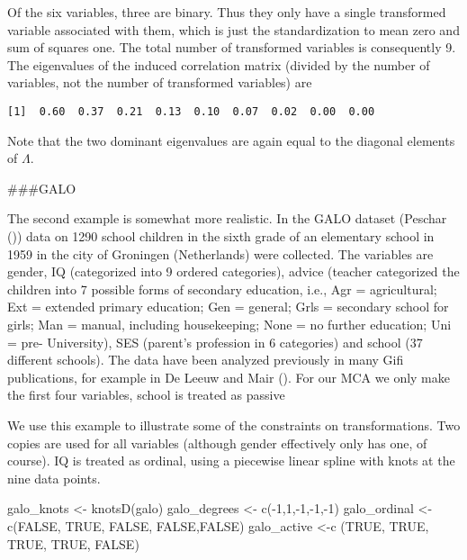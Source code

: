 \documentclass[
  12pt,
  letterpaper,
]{scrbook}
\newenvironment{Shaded}{\begin{snugshade}}{\end{snugshade}}
\newcommand{\ConstantTok}[1]{\textcolor[rgb]{0.56,0.35,0.01}{#1}}
\newcommand{\DecValTok}[1]{\textcolor[rgb]{0.68,0.00,0.00}{#1}}
\newcommand{\FunctionTok}[1]{\textcolor[rgb]{0.28,0.35,0.67}{#1}}
\newcommand{\NormalTok}[1]{\textcolor[rgb]{0.00,0.23,0.31}{#1}}
\newcommand{\OtherTok}[1]{\textcolor[rgb]{0.00,0.23,0.31}{#1}}
\newcommand{\SpecialCharTok}[1]{\textcolor[rgb]{0.37,0.37,0.37}{#1}}
\begin{document}
Of the six variables, three are binary. Thus they only have a single
transformed variable associated with them, which is just the
standardization to mean zero and sum of squares one. The total number of
transformed variables is consequently 9. The eigenvalues of the induced
correlation matrix (divided by the number of variables, not the number
of transformed variables) are

\begin{verbatim}
[1]  0.60  0.37  0.21  0.13  0.10  0.07  0.02  0.00  0.00
\end{verbatim}

Note that the two dominant eigenvalues are again equal to the diagonal
elements of \(\Lambda\).

\#\#\#GALO

The second example is somewhat more realistic. In the GALO dataset
(Peschar ()) data on 1290 school children
in the sixth grade of an elementary school in 1959 in the city of
Groningen (Netherlands) were collected. The variables are gender, IQ
(categorized into 9 ordered categories), advice (teacher categorized the
children into 7 possible forms of secondary education, i.e., Agr =
agricultural; Ext = extended primary education; Gen = general; Grls =
secondary school for girls; Man = manual, including housekeeping; None =
no further education; Uni = pre- University), SES (parent's profession
in 6 categories) and school (37 different schools). The data have been
analyzed previously in many Gifi publications, for example in De Leeuw
and Mair (). For our MCA we only
make the first four variables, school is treated as passive

We use this example to illustrate some of the constraints on
transformations. Two copies are used for all variables (although gender
effectively only has one, of course). IQ is treated as ordinal, using a
piecewise linear spline with knots at the nine data points.

\begin{Shaded}
\begin{Highlighting}[]
\NormalTok{galo\_knots }\OtherTok{\textless{}{-}} \FunctionTok{knotsD}\NormalTok{(galo)}
\NormalTok{galo\_degrees }\OtherTok{\textless{}{-}} \FunctionTok{c}\NormalTok{(}\SpecialCharTok{{-}}\DecValTok{1}\NormalTok{,}\DecValTok{1}\NormalTok{,}\SpecialCharTok{{-}}\DecValTok{1}\NormalTok{,}\SpecialCharTok{{-}}\DecValTok{1}\NormalTok{,}\SpecialCharTok{{-}}\DecValTok{1}\NormalTok{)}
\NormalTok{galo\_ordinal }\OtherTok{\textless{}{-}} \FunctionTok{c}\NormalTok{(}\ConstantTok{FALSE}\NormalTok{, }\ConstantTok{TRUE}\NormalTok{, }\ConstantTok{FALSE}\NormalTok{, }\ConstantTok{FALSE}\NormalTok{,}\ConstantTok{FALSE}\NormalTok{)}
\NormalTok{galo\_active }\OtherTok{\textless{}{-}}\FunctionTok{c}\NormalTok{ (}\ConstantTok{TRUE}\NormalTok{, }\ConstantTok{TRUE}\NormalTok{, }\ConstantTok{TRUE}\NormalTok{, }\ConstantTok{TRUE}\NormalTok{, }\ConstantTok{FALSE}\NormalTok{)}
\end{Highlighting}
\end{Shaded}
\end{document}
